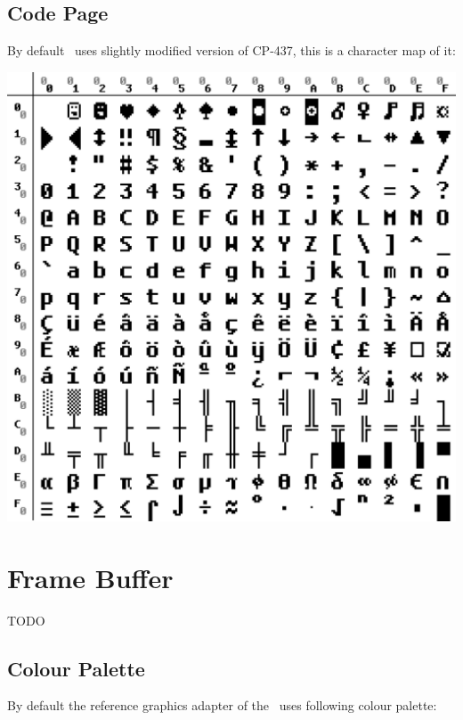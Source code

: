 \subsection{Code Page}
\label{codepage}

By default \thismachine\ uses slightly modified version of CP-437, this is a character map of it:

{\centering
\includegraphics[width=\linewidth]{tsvmcp.png}
\label{fig:codepage}
}
\newpage


\section{Frame Buffer}

TODO

\subsection{Colour Palette}
\label{colourpalette}

By default the reference graphics adapter of the \thismachine\ uses following colour palette:

